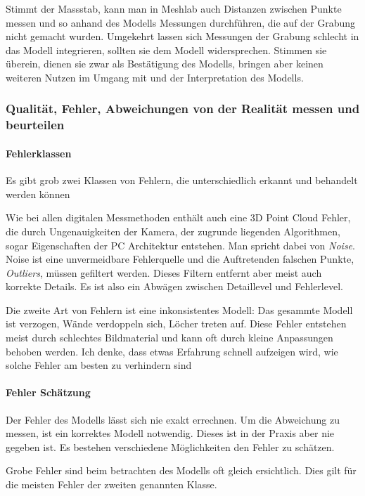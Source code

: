 \documentclass{paper}
\begin{document}
				Stimmt der Massstab, kann man in Meshlab auch Distanzen zwischen Punkte messen und so anhand des Modells Messungen durchführen, die auf der Grabung nicht gemacht wurden.
				Umgekehrt lassen sich Messungen der Grabung schlecht in das Modell integrieren, sollten sie dem Modell widersprechen. Stimmen sie überein, dienen sie zwar als Bestätigung des Modells, bringen aber keinen weiteren Nutzen im Umgang mit und der Interpretation des Modells.

			\subsubsection{Qualität, Fehler, Abweichungen von der Realität messen und beurteilen}
				\paragraph{Fehlerklassen}
				Es gibt grob zwei Klassen von Fehlern, die unterschiedlich erkannt und behandelt werden können
								
				Wie bei allen digitalen Messmethoden enthält auch eine 3D Point Cloud Fehler, die durch Ungenauigkeiten der Kamera, der zugrunde liegenden Algorithmen, sogar Eigenschaften der PC Architektur entstehen. Man spricht dabei von \emph{Noise}.
				Noise ist eine unvermeidbare Fehlerquelle und die Auftretenden falschen Punkte, \emph{Outliers}, müssen gefiltert werden. Dieses Filtern entfernt aber meist auch korrekte Details. Es ist also ein Abwägen zwischen Detaillevel und Fehlerlevel.
				
				Die zweite Art von Fehlern ist eine inkonsistentes Modell: Das gesammte Modell ist verzogen, Wände verdoppeln sich, Löcher treten auf.
				Diese Fehler entstehen meist durch schlechtes Bildmaterial und kann oft durch kleine Anpassungen behoben werden. Ich denke, dass etwas Erfahrung schnell aufzeigen wird, wie solche Fehler am besten zu verhindern sind
				 \paragraph{Fehler Schätzung}
				Der Fehler des Modells lässt sich nie exakt errechnen. Um die Abweichung zu messen, ist ein korrektes Modell notwendig. Dieses ist in der Praxis aber nie gegeben ist.
				Es bestehen verschiedene Möglichkeiten den Fehler zu schätzen.
				
				Grobe Fehler sind beim betrachten des Modells oft gleich ersichtlich. Dies gilt für die meisten Fehler der zweiten genannten Klasse.
				
\end{document}
